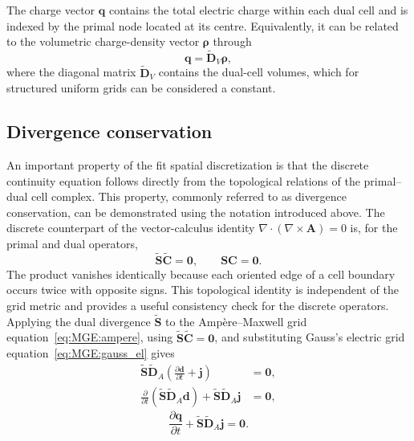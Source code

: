 The charge vector $\mathbf q$ contains the total electric charge within each dual cell and is indexed by the primal node located at its centre. Equivalently, it can be related to the volumetric charge-density vector $\boldsymbol{\rho}$ through
%
\begin{equation}
\mathbf q
=
\widetilde{\mathbf D}_V\boldsymbol{\rho},
\end{equation}
%
where the diagonal matrix $\widetilde{\mathbf D}_V$ contains the dual-cell volumes, which for structured uniform grids can be considered a constant.

\subsection{Divergence conservation}

An important property of the \gls{fit} spatial discretization is that the discrete continuity equation follows directly from the topological relations of the primal--dual cell complex. This property, commonly referred to as divergence conservation, can be demonstrated using the notation introduced above. The discrete counterpart of the vector-calculus identity $\nabla\cdot(\nabla\times\mathbf{A})=0$ is, for the primal and dual operators,
\begin{equation}
\widetilde{\mathbf{S}}\widetilde{\mathbf{C}}=\mathbf{0},
\qquad
\mathbf{S}\mathbf{C}=\mathbf{0}.
\label{eq:discrete_div_curl}
\end{equation}
The product vanishes identically because each oriented edge of a cell boundary occurs twice with opposite signs. This topological identity is independent of the grid metric and provides a useful consistency check for the discrete operators. Applying the dual divergence $\widetilde{\mathbf{S}}$ to the Amp\`ere--Maxwell grid equation~\eqref{eq:MGE:ampere}, using $\widetilde{\mathbf{S}}\widetilde{\mathbf{C}}=\mathbf{0}$, and substituting Gauss's electric grid equation~\eqref{eq:MGE:gauss_el} gives
\begin{align}
\widetilde{\mathbf{S}}\widetilde{\mathbf{D}}_A
\left(\frac{\partial\mathbf{d}}{\partial t}+\mathbf{j}\right)
&=\mathbf{0},
\\
\frac{\partial}{\partial t}
\left(\widetilde{\mathbf{S}}\widetilde{\mathbf{D}}_A\mathbf{d}\right)
+\widetilde{\mathbf{S}}\widetilde{\mathbf{D}}_A\mathbf{j} &=\mathbf{0},
\end{align}
\begin{equation}
\boxed{
\frac{\partial\mathbf{q}}{\partial t}
+\widetilde{\mathbf{S}}\widetilde{\mathbf{D}}_A\mathbf{j} =\mathbf{0} }.
\label{eq:discrete_continuity}
\end{equation}
